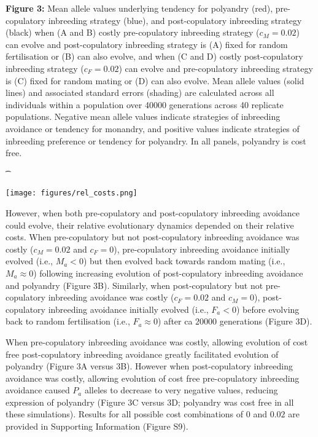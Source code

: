 \documentclass[10pt,letterpaper]{article}
\begin{document}
{\color{Gray}
\begin{adjustwidth}{-2.2in}{0in}
{%
   \begin{justify}\vspace{0.25 mm} \textbf{Figure 3:} Mean allele values underlying tendency for polyandry (red), pre-copulatory inbreeding strategy (blue), and post-copulatory inbreeding strategy (black) when (A and B) costly pre-copulatory inbreeding strategy ($c_{M} = 0.02$) can evolve and post-copulatory inbreeding strategy is (A) fixed for random fertilisation or (B) can also evolve, and when (C and D) costly post-copulatory inbreeding strategy ($c_{F} = 0.02$) can evolve and pre-copulatory inbreeding strategy is (C) fixed for random mating or (D) can also evolve. Mean allele values (solid lines) and associated standard errors (shading) are calculated across all individuals within a population over 40000 generations across 40 replicate populations. Negative mean allele values indicate strategies of inbreeding avoidance or tendency for monandry, and positive values indicate strategies of inbreeding preference or tendency for polyandry. In all panels, polyandry is cost free. \end{justify}{\t}%
}
{%
   \texttt{[image: figures/rel\_costs.png]}%
}%
\end{adjustwidth}
}

However, when both pre-copulatory and post-copulatory inbreeding avoidance could evolve, their relative evolutionary dynamics depended on their relative costs. When pre-copulatory but not post-copulatory inbreeding avoidance was costly ($c_{M}=0.02$ and $c_{F}=0$), pre-copulatory inbreeding avoidance initially evolved (i.e., $M_{a} < 0$) but then evolved back towards random mating (i.e., $M_{a} \approx 0$) following increasing evolution of post-copulatory inbreeding avoidance and polyandry (Figure 3B). Similarly, when post-copulatory but not pre-copulatory inbreeding avoidance was costly ($c_{F}=0.02$ and $c_{M}=0$), post-copulatory inbreeding avoidance initially evolved (i.e., $F_{a} < 0$) before evolving back to random fertilisation (i.e., $F_{a} \approx 0$) after ca $20000$ generations (Figure 3D).

When pre-copulatory inbreeding avoidance was costly, allowing evolution of cost free post-copulatory inbreeding avoidance greatly facilitated evolution of polyandry (Figure 3A versus 3B). However when post-copulatory inbreeding avoidance was costly, allowing evolution of cost free pre-copulatory inbreeding avoidance caused $P_{a}$ alleles to decrease to very negative values, reducing expression of polyandry (Figure 3C versus 3D; polyandry was cost free in all these simulations). Results for all possible cost combinations of $0$ and $0.02$ are provided in Supporting Information (Figure S9).
\end{document}
